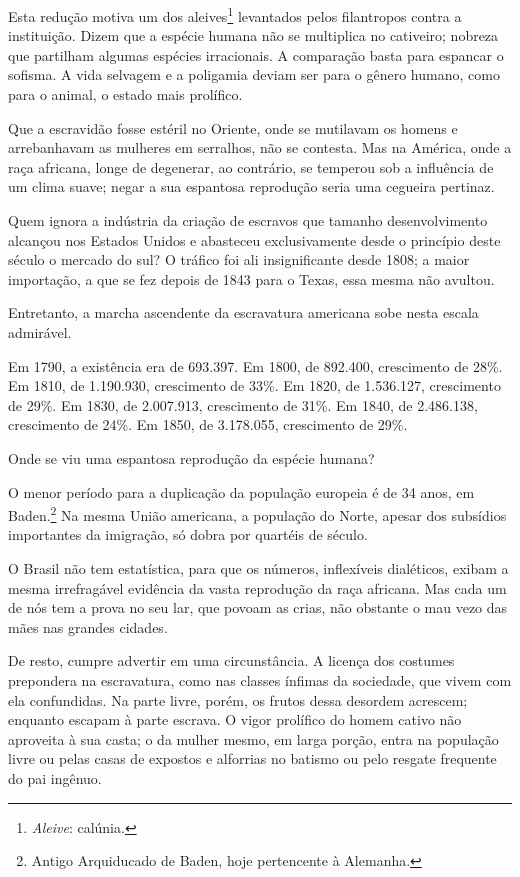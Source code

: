  Esta redução motiva um dos
aleives\footnote{ \textit{Aleive}: calúnia.}
 levantados pelos filantropos contra a instituição. Dizem que a espécie
humana não se multiplica no cativeiro; nobreza que partilham algumas
espécies irracionais. A comparação basta para espancar o sofisma. A
vida selvagem e a poligamia deviam ser para o gênero humano, como para
o animal, o estado mais prolífico.

 Que a escravidão fosse estéril no Oriente, onde se mutilavam os homens
e arrebanhavam as mulheres em serralhos, não se contesta. Mas na
América, onde a raça africana, longe de degenerar, ao contrário, se
temperou sob a influência de um clima suave; negar a sua espantosa
reprodução seria uma cegueira pertinaz. 

 Quem ignora a indústria da criação de escravos que tamanho
desenvolvimento alcançou nos Estados Unidos e abasteceu exclusivamente
desde o princípio deste século o mercado do sul? O tráfico foi ali
insignificante desde 1808; a maior importação, a que se fez depois de
1843 para o Texas, essa mesma não avultou. 

 Entretanto, a marcha ascendente da escravatura americana sobe nesta
escala admirável.

 Em 1790, a existência era de 693.397. Em 1800, de 892.400, crescimento
de 28\%. Em 1810, de 1.190.930, crescimento de 33\%. Em 1820, de
1.536.127, crescimento de 29\%. Em 1830, de 2.007.913, crescimento de
31\%. Em 1840, de 2.486.138, crescimento de 24\%. Em 1850, de
3.178.055, crescimento de 29\%. 

 Onde se viu uma espantosa reprodução da espécie humana?	\label{reproducao}

 O menor período para a duplicação da população europeia é de 34 anos,
em Baden.\footnote{ Antigo Arquiducado de Baden, hoje pertencente à Alemanha.}
 Na mesma União americana, a população do Norte, apesar dos subsídios
importantes da imigração, só dobra por quartéis de século.

 O Brasil não tem estatística, para que os números, inflexíveis
dialéticos, exibam a mesma irrefragável evidência da vasta reprodução
da raça africana. Mas cada um de nós tem a prova no seu lar, que povoam
as crias, não obstante o mau vezo das mães nas grandes cidades. 

 De resto, cumpre advertir em uma circunstância. A licença dos costumes
prepondera na escravatura, como nas classes ínfimas da sociedade, que
vivem com ela confundidas. Na parte livre, porém, os frutos dessa
desordem acrescem; enquanto escapam à parte escrava. O vigor prolífico
do homem cativo não aproveita à sua casta; o da mulher mesmo, em larga
porção, entra na população livre ou \mbox{pelas} casas de expostos e alforrias
no batismo ou pelo resgate frequente do pai ingênuo.

